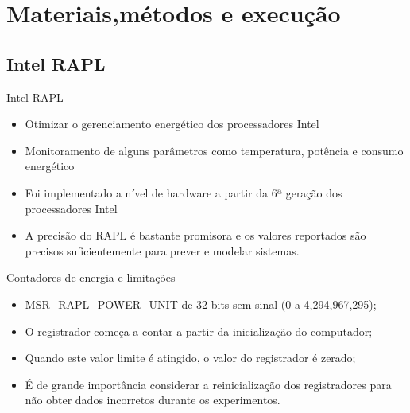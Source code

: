 \section{Materiais,métodos e execução}

\subsection{Intel RAPL}
\begin{frame}{Intel RAPL}
    \begin{itemize}
        \item Otimizar o gerenciamento energético dos processadores Intel
        \item Monitoramento de alguns parâmetros como temperatura, potência e consumo energético
        \item Foi implementado a nível de hardware a partir da 6ª geração dos processadores Intel
        \item A precisão do RAPL é bastante promisora e os valores reportados são precisos suficientemente para prever e modelar sistemas. \cite{khan2018IntelRapl}
    \end{itemize}
\end{frame}


\begin{frame}{Contadores de energia e limitações}
    \begin{itemize}
        \item MSR\_RAPL\_POWER\_UNIT de 32 bits sem sinal (0 a 4,294,967,295);
        \item O registrador começa a contar a partir da inicialização do computador;
        \item Quando este valor limite é atingido, o valor do registrador é zerado;
        \item É de grande importância considerar a reinicialização
        dos registradores para não obter dados incorretos durante os experimentos.
    \end{itemize}
\end{frame}

